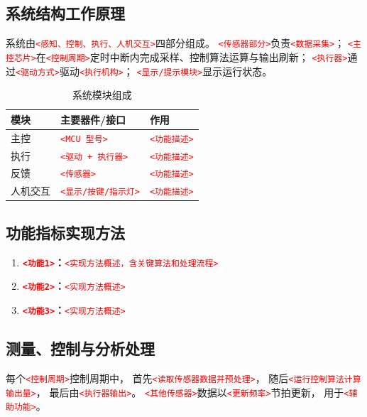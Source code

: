 \documentclass[12pt,a4paper,fontset=fandol]{ctexart}
\newcommand{\placeholder}[1]{\textcolor{red}{\texttt{<#1>}}}
\begin{document}
\subsection{系统结构工作原理}
系统由\placeholder{感知、控制、执行、人机交互}四部分组成。
\placeholder{传感器部分}负责\placeholder{数据采集}；
\placeholder{主控芯片}在\placeholder{控制周期}定时中断内完成采样、控制算法运算与输出刷新；
\placeholder{执行器}通过\placeholder{驱动方式}驱动\placeholder{执行机构}；
\placeholder{显示/提示模块}显示运行状态。

\begin{table}[H]
\centering
\caption{系统模块组成}
\begin{tabularx}{\textwidth}{p{2.2cm}p{4cm}Y}
\toprule
模块 & 主要器件/接口 & 作用\\
\midrule
主控 & \placeholder{MCU 型号} & \placeholder{功能描述}\\
执行 & \placeholder{驱动 + 执行器} & \placeholder{功能描述}\\
反馈 & \placeholder{传感器} & \placeholder{功能描述}\\
人机交互 & \placeholder{显示/按键/指示灯} & \placeholder{功能描述}\\
\bottomrule
\end{tabularx}
\end{table}


\subsection{功能指标实现方法}
\begin{enumerate}
  \item \textbf{\placeholder{功能1}：}\placeholder{实现方法概述，含关键算法和处理流程}
  \item \textbf{\placeholder{功能2}：}\placeholder{实现方法概述}
  \item \textbf{\placeholder{功能3}：}\placeholder{实现方法概述}
\end{enumerate}

\subsection{测量、控制与分析处理}
每个\placeholder{控制周期}控制周期中，
首先\placeholder{读取传感器数据并预处理}，
随后\placeholder{运行控制算法计算输出量}，
最后由\placeholder{执行器输出}。
\placeholder{其他传感器}数据以\placeholder{更新频率}节拍更新，
用于\placeholder{辅助功能}。
\end{document}
